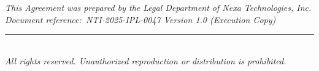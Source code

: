 \documentclass[11pt,a4paper]{article}
\begin{document}
\vspace{14pt}

\begin{center}
  \small\color{NexaMuted}
  \textit{This Agreement was prepared by the Legal Department of Nexa Technologies, Inc.}\\[2pt]
  \textit{Document reference:\ NTI-2025-IPL-0047 \textbullet{} Version 1.0 (Execution Copy)}\\[4pt]
  {\color{NexaRule}\rule{0.5\textwidth}{0.4pt}}\\[4pt]
  \textit{All rights reserved. Unauthorized reproduction or distribution is prohibited.}
\end{center}
\end{document}
